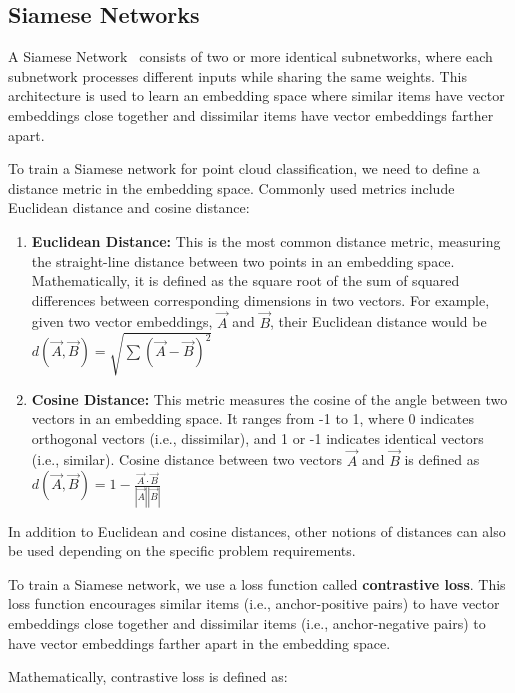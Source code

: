 \subsection{Siamese Networks}\label{ssec:siamese}

    A Siamese Network~\cite{SiameseNN} consists of two or more identical subnetworks, where each subnetwork processes different inputs while sharing the same weights. This architecture is used to learn an embedding space where similar items have vector embeddings close together and dissimilar items have vector embeddings farther apart.
    
    To train a Siamese network for point cloud classification, we need to define a distance metric in the embedding space. Commonly used metrics include Euclidean distance and cosine distance:
    
    \begin{enumerate}
        \item \textbf{Euclidean Distance:} This is the most common distance metric, measuring the straight-line distance between two points in an embedding space. Mathematically, it is defined as the square root of the sum of squared differences between corresponding dimensions in two vectors. For example, given two vector embeddings, $\vec{A}$ and $\vec{B}$, their Euclidean distance would be $d(\vec{A}, \vec{B}) = \sqrt{\sum(\vec{A} - \vec{B})^2}$
        \item \textbf{Cosine Distance:} This metric measures the cosine of the angle between two vectors in an embedding space. It ranges from -1 to 1, where 0 indicates orthogonal vectors (i.e., dissimilar), and 1 or -1 indicates identical vectors (i.e., similar). Cosine distance between two vectors $\vec{A}$ and $\vec{B}$ is defined as $d(\vec{A}, \vec{B}) = 1 - \frac{\vec{A} \cdot \vec{B}}{|\vec{A}||\vec{B}|}$
    \end{enumerate}
    
    In addition to Euclidean and cosine distances, other notions of distances can also be used depending on the specific problem requirements.
    
    To train a Siamese network, we use a loss function called \textbf{contrastive loss}. This loss function encourages similar items (i.e., anchor-positive pairs) to have vector embeddings close together and dissimilar items (i.e., anchor-negative pairs) to have vector embeddings farther apart in the embedding space.
    
    Mathematically, contrastive loss is defined as:
    
